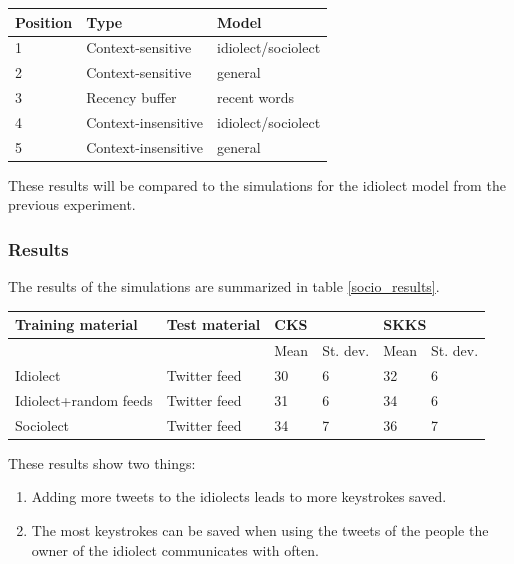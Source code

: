 \documentclass[12pt]{article}
\let\originaltable\table
\let\endoriginaltable\endtable
\renewenvironment{table}[1][ht]{%
  \originaltable[#1]
  \centering}%
  {\endoriginaltable}
\begin{document}
\begin{table}[H]
\begin{tabular}{lll} 
Position&Type&Model\\
\hline
1&Context-sensitive&idiolect/sociolect\\
2&Context-sensitive&general\\
3&Recency buffer&recent words\\
4&Context-insensitive&idiolect/sociolect\\
5&Context-insensitive&general\\
\end{tabular} 
\caption{The best performing module set-up} \label{replicate_setup}
\end{table}

These results will be compared to the simulations for the idiolect model from the previous experiment.

\subsubsection{Results}

The results of the simulations are summarized in table \ref{socio_results}.

\begin{table}[H] 
\centering
\begin{tabular}{ll|llll} 
Training material&Test material&\multicolumn{2}{l}{CKS}&\multicolumn{2}{l}{SKKS}\\
\hline
&&Mean&St. dev.&Mean&St. dev.\\
Idiolect&Twitter feed&30&6&32&6\\
Idiolect+random feeds&Twitter feed&31&6&34&6\\
Sociolect&Twitter feed&34&7&36&7\\
\end{tabular} 
\caption{Mean percentage of keystrokes saved when using an idiolect, an extended idiolect and a sociolect.} \label{socio_results}
\end{table}


These results show two things:

\begin{enumerate}
\item Adding more tweets to the idiolects leads to more keystrokes saved.
\item The most keystrokes can be saved when using the tweets of the people the owner of the idiolect communicates with often.
\end{enumerate}
\end{document}
